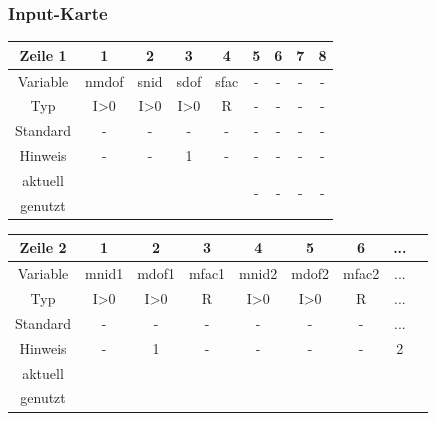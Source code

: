 \documentclass[11pt,titlepage,listof=totoc,bibliography=totoc,twoside]{scrreprt}
\begin{document}
{{\subsubsection{Input-Karte}

\begin{table}[htbp]
\centering
\begin{tabularx}{\textwidth}{cCCCCCCCC}
\toprule
Zeile 1	& 1		& 2		& 3		& 4		& 5		& 6		& 7	& 8	\\
\midrule
Variable& nmdof		& snid		& sdof		& sfac		& -		& -		& -	& -	\\
Typ	& I>0		& I>0		& I>0		& R		& -		& -		& -	& -	\\
Standard& -		& -		& -		& -		& -		& -		& -	& -	\\
Hinweis	& -		& -		& 1		& -		& -		& -		& -	& -	\\
aktuell	& 	& 	& 	& 	& 	& \multirow{2}{*}{-}	& 	& 	\\
genutzt \\
\bottomrule
\end{tabularx}
\end{table}

\begin{table}[htbp]
\centering
\begin{tabularx}{\textwidth}{cCCCCCCCC}
\toprule
Zeile 2	& 1		& 2		& 3		& 4		&  5		&  6		&  ...		&  		\\
\midrule
Variable& mnid1		& mdof1		& mfac1		& mnid2		&  mdof2	&  mfac2	&  ...		&  		\\
Typ	& I>0		& I>0		& R		& I>0		&  I>0		&  R		&  ...		&  		\\
Standard& -		& -		& -		& -		&  -		&  -		&  ...		&  		\\
Hinweis	& -		& 1		& -		& -		&  -		&  -		&  2		&  		\\
aktuell	& 	& 	& 	&  	&  	&  	&  	&  	\\
genutzt \\
\bottomrule
\end{tabularx}
\end{table}

}}
\end{document}
